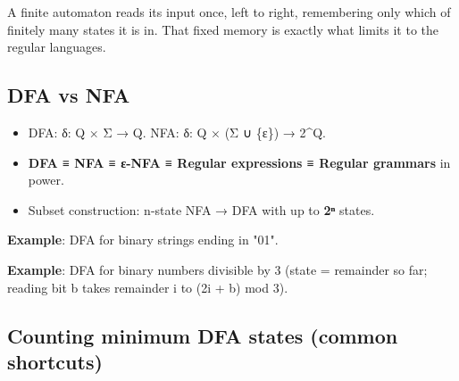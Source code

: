 A finite automaton reads its input once, left to right, remembering only which of finitely many states it is
in. That fixed memory is exactly what limits it to the regular languages.

\needspace{95pt}

\hypertarget{p2-08--31-dfa-vs-nfa}{%
\subsection{DFA vs NFA}\label{p2-08--31-dfa-vs-nfa}}

\begin{itemize}
\tightlist
\item
  DFA: δ: Q × Σ → Q. NFA: δ: Q × (Σ ∪ \{ε\}) → 2\^{}Q.
\item
  \textbf{DFA ≡ NFA ≡ ε-NFA ≡ Regular expressions ≡ Regular grammars} in power.
\item
  Subset construction: n-state NFA → DFA with up to \textbf{2ⁿ} states.
\end{itemize}

\textbf{Example}: DFA for binary strings ending in "01".



\textbf{Example}: DFA for binary numbers divisible by 3 (state = remainder so far; reading bit b takes remainder i to (2i + b) mod 3).



\needspace{130pt}

\hypertarget{p2-08--32-counting-minimum-dfa-states-common-shortcuts}{%
\subsection{Counting minimum DFA states (common shortcuts)}\label{p2-08--32-counting-minimum-dfa-states-common-shortcuts}}

\begingroup\small

